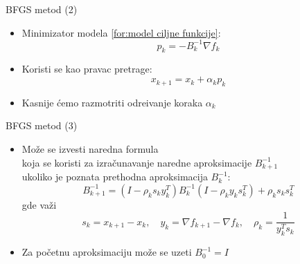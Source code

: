 \documentclass[serbian]{beamer}
\begin{document}
\begin{frame}{BFGS metod (2)}

\begin{itemize}
	\item Minimizator modela \ref{for:model ciljne funkcije}:
	\begin{equation}\label{for:pravac pretrage}
		p_k = -B_k^{-1} \nabla f_k
	\end{equation}
	
	\item Koristi se kao pravac pretrage:
	\begin{equation*}
		x_{k+1} = x_k + \alpha_k p_k
	\end{equation*}
	
	\item Kasnije \'cemo razmotriti odre\dj ivanje koraka $\alpha_k$
\end{itemize}

\end{frame}

\begin{frame}{BFGS metod (3)}

\begin{itemize}
	\item Mo\v ze se izvesti naredna formula \\
	koja se koristi za izra\v cunavanje naredne aproksimacije $B_{k+1}^{-1}$ \\
	ukoliko je poznata prethodna aproksimacija $B_k^{-1}$:
	\begin{equation}\label{for:BFGS formula}
		B_{k+1}^{-1} = (I - \rho_k s_k y_k^T)B_k^{-1}(I - \rho_k y_k s_k^T) + \rho_k s_k s_k^T
	\end{equation}
	gde va\v zi
	\begin{equation*}
		s_k = x_{k+1} - x_k, \quad y_k = \nabla f_{k+1} - \nabla f_k, \quad \rho_k = \dfrac{1}{y_k^T s_k}
	\end{equation*}
	
	\item Za po\v cetnu aproksimaciju mo\v ze se uzeti $B_0^{-1} = I$
\end{itemize}

\end{frame}
\end{document}
